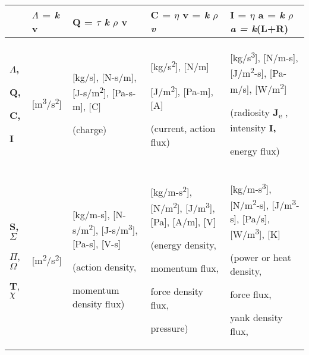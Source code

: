 \documentclass[a4paper]{article}
\begin{document}
\begin{flushleft}
\tablefirsthead{}
\tablehead{}
\tabletail{}
\tablelasttail{}
\begin{supertabular}{|m{1.737cm}|m{1.763cm}|m{3.698cm}|m{3.7cm}|m{4.0090003cm}|}
\hline
 &
\textbf{$\Lambda $} =  \textit{k} \textbf{v} &
\textbf{Q} =  $\tau $ \textit{k}\textit{ $\rho $ }\textbf{v} &
\textbf{C} = $\eta $ \textbf{v} =  \textit{k}\textit{ $\rho $ }\textbf{\textit{v}} &
\textbf{I} = $\eta $ \textbf{a} = \textit{k}\textit{ $\rho $ }\textbf{\textit{a}}\textit{ =
}\textit{k}(\textbf{L}+\textbf{R})\\\hline
{\bfseries $\Lambda $, }

{\bfseries Q, }

{\bfseries C, }

{\bfseries I} &
[m\textsuperscript{3}/s\textsuperscript{2}]

 &
[kg/s], [N-s/m], [J-s/m\textsuperscript{2}], [Pa-s-m], [C]

(charge) &
[kg/s\textsuperscript{2}], [N/m]

[J/m\textsuperscript{2}], [Pa-m], [A]

(current, action flux) &
[kg/s\textsuperscript{3}], [N/m-s], [J/m\textsuperscript{2}{}-s], [Pa-m/s], [W/m\textsuperscript{2}] 

(radiosity \textbf{J}\textsubscript{e }, intensity \textbf{I, }

energy flux)\\\hline
\textbf{S,  $\Sigma $}

\href{https://en.wikipedia.org/wiki/Pi_(letter)}{$\Pi $}, \textbf{$\Omega $}

\textbf{T}, \textbf{$\chi $} &
[m\textsuperscript{2}/s\textsuperscript{2}] &
[kg/m-s], [N-s/m\textsuperscript{2}], [J-s/m\textsuperscript{3}], [Pa-s], [V-s]  

(action density,

momentum density flux) &
[kg/m-s\textsuperscript{2}], [N/m\textsuperscript{2}], [J/m\textsuperscript{3}], [Pa], [A/m], [V]

(energy density,

momentum flux, 

force density flux, 

pressure) &
[kg/m-s\textsuperscript{3}], [N/m\textsuperscript{2}{}-s], [J/m\textsuperscript{3}{}-s], [Pa/s],
[W/m\textsuperscript{3}], [K]

(power or heat density, 

force flux,

yank density flux, 


\end{supertabular}
\end{flushleft}
\end{document}
